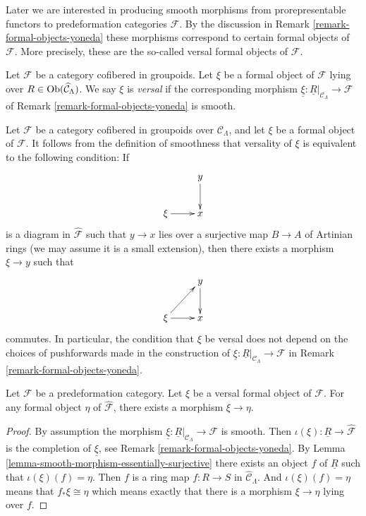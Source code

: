 \noindent
Later we are interested in producing smooth morphisms from
prorepresentable functors to predeformation categories $\mathcal{F}$.
By the discussion in
Remark \ref{remark-formal-objects-yoneda}
these morphisms correspond to certain formal objects of $\mathcal{F}$.
More precisely, these are the so-called versal formal objects of $\mathcal{F}$.

\begin{definition}
\label{definition-versal}
Let $\mathcal{F}$ be a category cofibered in groupoids.  Let $\xi$ be a formal
object of $\mathcal{F}$ lying over $R \in \mathop{\mathrm{Ob}}\nolimits(\widehat{\mathcal{C}}_\Lambda)$.
We say $\xi$ is {\it versal} if the corresponding morphism
$\underline{\xi}: \underline{R}|_{\mathcal{C}_\Lambda} \to \mathcal{F}$
of Remark \ref{remark-formal-objects-yoneda} is smooth.
\end{definition}

\begin{remark}
\label{remark-versal-object}
Let $\mathcal{F}$ be a category cofibered in groupoids over $\mathcal
C_\Lambda$, and let $\xi$ be a formal object of $\mathcal{F}$.  It follows
from the definition of smoothness that versality of $\xi$ is equivalent to the
following condition: If
$$
\xymatrix{
& y \ar[d] \\
\xi \ar[r] & x
}
$$
is a diagram in $\widehat{\mathcal{F}}$ such that $y \to x$ lies over a
surjective map $B \to A$ of Artinian rings (we may assume it is a small
extension),  then there exists a morphism $\xi \to y$ such that
$$
\xymatrix{
& y \ar[d] \\
\xi \ar[r] \ar[ur] & x
}
$$
commutes. In particular, the condition that $\xi$ be versal does not depend on
the choices of pushforwards made in the construction of
$\underline{\xi} : \underline{R}|_{\mathcal{C}_\Lambda} \to \mathcal{F}$ in
Remark \ref{remark-formal-objects-yoneda}.
\end{remark}

\begin{lemma}
\label{lemma-versal-object-quasi-initial}
Let $\mathcal{F}$ be a predeformation category.
Let $\xi$ be a versal formal object of $\mathcal{F}$.
For any formal object $\eta$ of $\widehat{\mathcal{F}}$,
there exists a morphism $\xi \to \eta$.
\end{lemma}

\begin{proof}
By assumption the morphism
$\underline{\xi} : \underline{R}|_{\mathcal{C}_\Lambda} \to \mathcal{F}$
is smooth. Then
$\iota(\xi) : \underline{R} \to \widehat{\mathcal{F}}$
is the completion of $\underline{\xi}$, see
Remark \ref{remark-formal-objects-yoneda}.
By
Lemma \ref{lemma-smooth-morphism-essentially-surjective}
there exists an object $f$ of $\underline{R}$ such that
$\iota(\xi)(f) = \eta$. Then $f$ is
a ring map $f : R \to S$ in $\widehat{\mathcal{C}}_\Lambda$. And
$\iota(\xi)(f) = \eta$ means that
$f_*\xi \cong \eta$ which means exactly that there is a morphism
$\xi \to \eta$ lying over $f$.
\end{proof}





